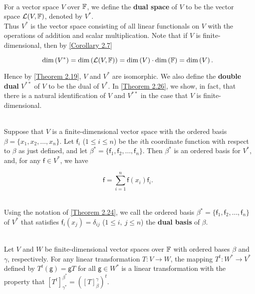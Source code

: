\begin{definition}
	\hfill\\
	For a vector space $V$ over $\mathbb{F}$, we define the \textbf{dual space} of $V$ to be the vector space $\mathcal{L}(V, \mathbb{F})$, denoted by $V^*$.\\
	
	Thus $V^*$ is the vector space consisting of all linear functionals on $V$ with the operations of addition and scalar multiplication. Note that if $V$ is finite-dimensional, then by \autoref{Corollary 2.7}
	
	\[\text{dim}\left(V^*\right)= \text{dim}\left(\mathcal{L}(V,\mathbb{F})\right) = \text{dim}\left(V\right) \cdot \text{dim}\left(\mathbb{F}\right) = \text{dim}\left(V\right).\]
	
	Hence by \autoref{Theorem 2.19}, $V$ and $V^*$ are isomorphic. We also define the \textbf{double dual} $V^{**}$ of $V$ to be the dual of $V^*$. In \autoref{Theorem 2.26}, we show, in fact, that there is a natural identification of $V$ and $V^{**}$ in the case that $V$ is finite-dimensional.
\end{definition}

\begin{theorem}\label{Theorem 2.24}
	\hfill\\
	Suppose that $V$ is a finite-dimensional vector space with the ordered basis $\beta = \{x_1, x_2, \dots, x_n\}$. Let $\mathsf{f}_i$ ($1 \leq i \leq n$) be the $i$th coordinate function with respect to $\beta$ as just defined, and let $\beta^*=\{\mathsf{f}_1, \mathsf{f}_2, \dots, \mathsf{f}_n\}$. Then $\beta^*$ is an ordered basis for $V^*$, and, for any $\mathsf{f} \in V^*$, we have
	
	\[\mathsf{f} = \sum_{i=1}^{n}\mathsf{f}(x_i)\mathsf{f}_i.\]
\end{theorem}

\begin{definition}
	\hfill\\
	Using the notation of \autoref{Theorem 2.24}, we call the ordered basis $\beta^* = \{\mathsf{f}_1, \mathsf{f}_2, \dots, \mathsf{f}_n\}$ of $V^*$ that satisfies $\mathsf{f}_i(x_j) = \delta_{ij}$ ($1 \leq i,\ j \leq n$) the \textbf{dual basis} of $\beta$.
\end{definition}

\begin{theorem}\label{Theorem 2.25}
	\hfill\\
	Let $V$ and $W$ be finite-dimensional vector spaces over $\mathbb{F}$ with ordered bases $\beta$ and $\gamma$, respectively. For any linear transformation $T: V \to W$, the mapping $T^t: W^* \to V^*$ defined by $T^t(\mathsf{g}) = \mathsf{g}T$ for all $\mathsf{g} \in W^*$ is a linear transformation with the property that $[T^t]_{\gamma^*}^{\beta^*} = ([T]_\beta^\gamma)^t$.
\end{theorem}

